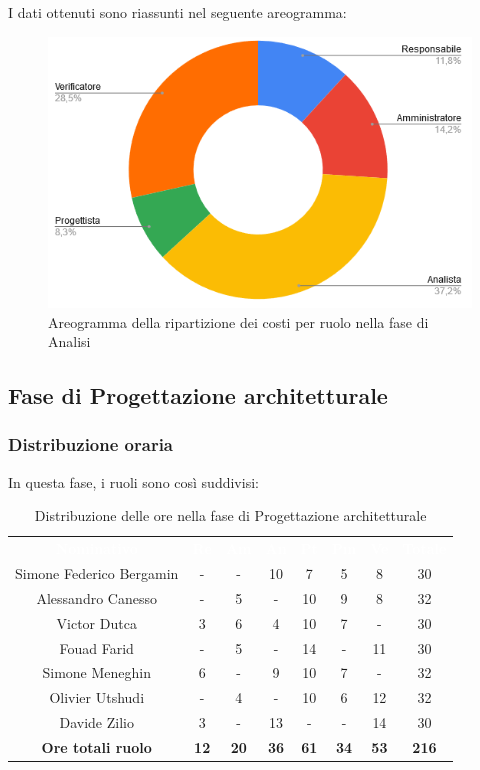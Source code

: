 I dati ottenuti sono riassunti nel seguente areogramma:
\begin{figure}[H]
\centering
\includegraphics[scale=0.60]{img/grafici/torta_fase_analisi_prospetto_economico.png}
\caption{Areogramma della ripartizione dei costi per ruolo nella fase di Analisi}
\end{figure}
 
 
\subsection{Fase di Progettazione architetturale}
\subsubsection{Distribuzione oraria}
In questa fase, i ruoli sono così suddivisi:
\begin{table}[H]
\centering\renewcommand{\arraystretch}{1.5}
\caption{Distribuzione delle ore nella fase di Progettazione architetturale}
\vspace{0.2cm}
\begin{tabular}{ c | c | c | c | c | c | c | c }
\rowcolor{redafk}
\textcolor{white}{\textbf{Nominativo}} & \textcolor{white}{\textbf{Re}} &
\textcolor{white}{\textbf{Am}} & \textcolor{white}{\textbf{An}} &
\textcolor{white}{\textbf{Pt}} & \textcolor{white}{\textbf{Pm}} &
\textcolor{white}{\textbf{Ve}} & \textcolor{white}{\textbf{Totale}} \\
Simone Federico Bergamin & - & - & 10 & 7 & 5 & 8 & 30 \\
Alessandro Canesso & - & 5 & - & 10 & 9 & 8 & 32 \\
Victor Dutca & 3 & 6 & 4 & 10 & 7 & - & 30 \\
Fouad Farid & - & 5 & - & 14 & - & 11 & 30 \\
Simone Meneghin & 6 & - & 9 & 10 & 7 & - & 32 \\
Olivier Utshudi & - & 4 & - & 10 & 6 & 12 & 32 \\
Davide Zilio & 3 & - & 13 & - & - & 14 & 30 \\
\rowcolor{lastrowcolor}
\textbf{Ore totali ruolo} & \textbf{12} & \textbf{20} & \textbf{36} & \textbf{61} & \textbf{34} & \textbf{53} & \textbf{216} \\
\end{tabular}
\end{table}
 
